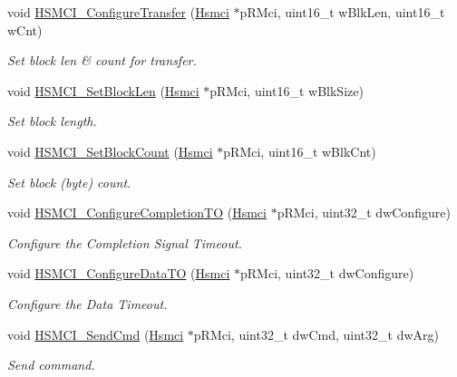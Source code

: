 \begin{DoxyCompactItemize}
void \mbox{\hyperlink{group__hsmci__functions_gab17151fd3e0b1a81b78067b7f07b0424}{H\+S\+M\+C\+I\+\_\+\+Configure\+Transfer}} (\mbox{\hyperlink{structHsmci}{Hsmci}} $\ast$p\+R\+Mci, uint16\+\_\+t w\+Blk\+Len, uint16\+\_\+t w\+Cnt)
\begin{DoxyCompactList}\small\item\em Set block len \& count for transfer. \end{DoxyCompactList}\item 
void \mbox{\hyperlink{group__hsmci__functions_gaa5df49e8ce9e84d0a598c8869aebf844}{H\+S\+M\+C\+I\+\_\+\+Set\+Block\+Len}} (\mbox{\hyperlink{structHsmci}{Hsmci}} $\ast$p\+R\+Mci, uint16\+\_\+t w\+Blk\+Size)
\begin{DoxyCompactList}\small\item\em Set block length. \end{DoxyCompactList}\item 
void \mbox{\hyperlink{group__hsmci__functions_ga3cb4486c346c94ee101913c757658e1a}{H\+S\+M\+C\+I\+\_\+\+Set\+Block\+Count}} (\mbox{\hyperlink{structHsmci}{Hsmci}} $\ast$p\+R\+Mci, uint16\+\_\+t w\+Blk\+Cnt)
\begin{DoxyCompactList}\small\item\em Set block (byte) count. \end{DoxyCompactList}\item 
void \mbox{\hyperlink{group__hsmci__functions_ga75c6f68a1b67b73c8b80482b5cc17c45}{H\+S\+M\+C\+I\+\_\+\+Configure\+Completion\+TO}} (\mbox{\hyperlink{structHsmci}{Hsmci}} $\ast$p\+R\+Mci, uint32\+\_\+t dw\+Configure)
\begin{DoxyCompactList}\small\item\em Configure the Completion Signal Timeout. \end{DoxyCompactList}\item 
void \mbox{\hyperlink{group__hsmci__functions_ga6668e349edf32e148bfd5fcf45b1eccc}{H\+S\+M\+C\+I\+\_\+\+Configure\+Data\+TO}} (\mbox{\hyperlink{structHsmci}{Hsmci}} $\ast$p\+R\+Mci, uint32\+\_\+t dw\+Configure)
\begin{DoxyCompactList}\small\item\em Configure the Data Timeout. \end{DoxyCompactList}\item 
void \mbox{\hyperlink{group__hsmci__functions_gabcc9bc86415267cdc2b54098b3dc9731}{H\+S\+M\+C\+I\+\_\+\+Send\+Cmd}} (\mbox{\hyperlink{structHsmci}{Hsmci}} $\ast$p\+R\+Mci, uint32\+\_\+t dw\+Cmd, uint32\+\_\+t dw\+Arg)
\begin{DoxyCompactList}\small\item\em Send command. \end{DoxyCompactList}\item 

\end{DoxyCompactItemize}
